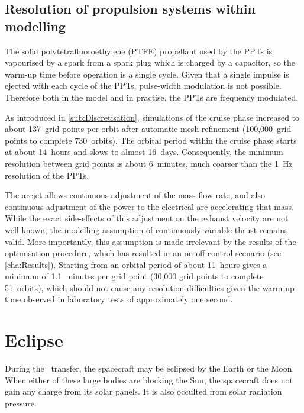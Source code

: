 \subsection{Resolution of propulsion systems within modelling}

The solid polytetrafluoroethylene (PTFE) propellant used by the PPTs is vapourised by a spark from a spark plug which is charged by a capacitor, so the warm-up time before operation is a single cycle. Given that a single impulse is ejected with each cycle of the PPTs, pulse-width modulation is not possible. Therefore both in the model and in practise, the PPTs are frequency modulated. 

As introduced in \autoref{sub:Discretisation}, simulations of the cruise phase increased to about 137~grid points per orbit after automatic mesh refinement (100,000~grid points to complete 730~orbits). The orbital period within the cruise phase starts at about 14~hours and slows to almost 16~days. Consequently, the minimum resolution between grid points is about 6~minutes, much coarser than the 1~Hz resolution of the PPTs.

The arcjet allows continuous adjustment of the mass flow rate, and also continuous adjustment of the power to the electrical arc accelerating that mass. While the exact side-effects of this adjustment on the exhaust velocity are not well known, the modelling assumption of continuously variable thrust remains valid. More importantly, this assumption is made irrelevant by the results of the optimisation procedure, which has resulted in an on-off control scenario (see \autoref{cha:Results}). Starting from an orbital period of about 11~hours gives a minimum of 1.1~minutes per grid point (30,000 grid points to complete 51~orbits), which should not cause any resolution difficulties given the warm-up time observed in laboratory tests of approximately one second. 


\section{Eclipse} \label{sec:Eclipse}

During the \BW\ transfer, the spacecraft may be eclipsed by the Earth or the Moon. When either of these large bodies are blocking the Sun, the spacecraft does not gain any charge from its solar panels. It is also occulted from solar radiation pressure. 

